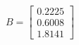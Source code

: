 

\[
B = \left[ \begin{array}{c} \mbox{0.2225} \\ \mbox{0.6008} \\ \mbox{1.8141} \end{array} \right]
\]


